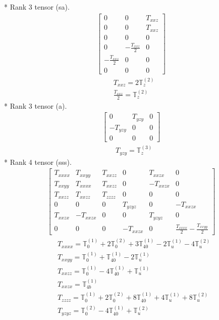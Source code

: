 \documentclass[fleqn,8pt,landscape]{jsarticle}
\begin{document}
* Rank 3 tensor (sa).
\begin{align*}
\begin{bmatrix} 0 & 0 & T_{xxz} \\ 0 & 0 & T_{xxz} \\ 0 & 0 & 0 \\ 0 & - \frac{T_{xxz}}{2} & 0 \\ - \frac{T_{xxz}}{2} & 0 & 0 \\ 0 & 0 & 0 \end{bmatrix}
\end{align*}
\begin{align*}
& T_{xxz} = 2 \mathbb{T}_{z}^{(2)} \\
& \frac{T_{xxz}}{2} = \mathbb{T}_{z}^{(2)}
\end{align*}
* Rank 3 tensor (a).
\begin{align*}
\begin{bmatrix} 0 & T_{yzy} & 0 \\ - T_{yzy} & 0 & 0 \\ 0 & 0 & 0 \end{bmatrix}
\end{align*}
\begin{align*}
& T_{yzy} = \mathbb{T}_{z}^{(3)}
\end{align*}
* Rank 4 tensor (sss).
\begin{align*}
\begin{bmatrix} T_{xxxx} & T_{xxyy} & T_{xxzz} & 0 & T_{xxzx} & 0 \\ T_{xxyy} & T_{xxxx} & T_{xxzz} & 0 & - T_{xxzx} & 0 \\ T_{xxzz} & T_{xxzz} & T_{zzzz} & 0 & 0 & 0 \\ 0 & 0 & 0 & T_{yzyz} & 0 & - T_{xxzx} \\ T_{xxzx} & - T_{xxzx} & 0 & 0 & T_{yzyz} & 0 \\ 0 & 0 & 0 & - T_{xxzx} & 0 & \frac{T_{xxxx}}{2} - \frac{T_{xxyy}}{2} \end{bmatrix}
\end{align*}
\begin{align*}
& T_{xxxx} = \mathbb{T}_{0}^{(1)} + 2 \mathbb{T}_{0}^{(2)} + 3 \mathbb{T}_{40}^{(1)} - 2 \mathbb{T}_{u}^{(1)} - 4 \mathbb{T}_{u}^{(2)} \\
& T_{xxyy} = \mathbb{T}_{0}^{(1)} + \mathbb{T}_{40}^{(1)} - 2 \mathbb{T}_{u}^{(1)} \\
& T_{xxzz} = \mathbb{T}_{0}^{(1)} - 4 \mathbb{T}_{40}^{(1)} + \mathbb{T}_{u}^{(1)} \\
& T_{xxzx} = \mathbb{T}_{4b}^{(1)} \\
& T_{zzzz} = \mathbb{T}_{0}^{(1)} + 2 \mathbb{T}_{0}^{(2)} + 8 \mathbb{T}_{40}^{(1)} + 4 \mathbb{T}_{u}^{(1)} + 8 \mathbb{T}_{u}^{(2)} \\
& T_{yzyz} = \mathbb{T}_{0}^{(2)} - 4 \mathbb{T}_{40}^{(1)} + \mathbb{T}_{u}^{(2)}
\end{align*}
\end{document}
